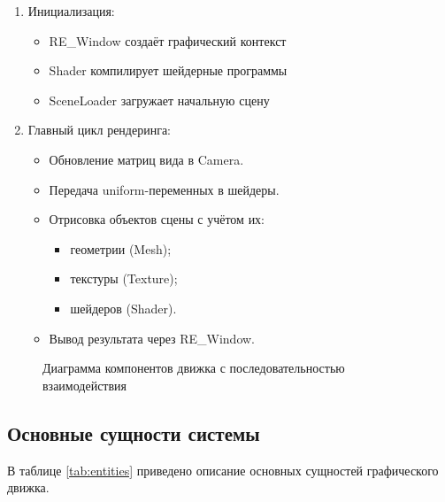 \begin{enumerate}
\item Инициализация:
   \begin{itemize}[itemindent=\parindent,leftmargin=\parindent]
       \item RE\_Window создаёт графический контекст
       \item Shader компилирует шейдерные программы
       \item SceneLoader загружает начальную сцену
   \end{itemize}

\item Главный цикл рендеринга:
   \begin{itemize}[itemindent=\parindent,leftmargin=\parindent]
       \item Обновление матриц вида в Camera.
       \item Передача uniform-переменных в шейдеры.
       \item Отрисовка объектов сцены с учётом их:
       \begin{itemize}[itemindent=\parindent,leftmargin=\parindent]
           \item геометрии (Mesh);
           \item текстуры (Texture);
           \item шейдеров (Shader).
       \end{itemize}
       \item Вывод результата через RE\_Window.
   \end{itemize}
\end{enumerate}

\begin{figure}[ht]
\centering
\caption{Диаграмма компонентов движка с последовательностью взаимодействия}
\label{comp:image}
\end{figure}

\subsection{Основные сущности системы}

В таблице \ref{tab:entities} приведено описание основных сущностей графического движка.

